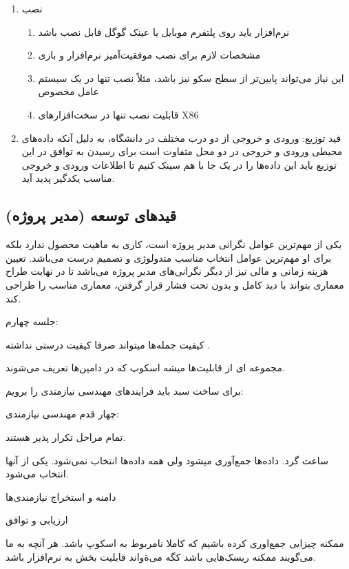 \begin{enumerate}
    \item نصب
    \begin{enumerate}
        \item نرم‌افزار باید روی پلتفرم موبایل یا عینک گوگل قابل نصب باشد
        \item مشخصات لازم برای نصب موفقیت‌آمیز نرم‌افزار و بازی
        \item این نیاز می‌تواند پایین‌تر از سطح سکو نیز باشد، مثلاً نصب تنها در
        یک سیستم عامل مخصوص
        \item قابلیت نصب تنها در سخت‌افزار‌های X86
    \end{enumerate}
    \item قید توزیع: ورودی و خروجی از دو درب مختلف در دانشگاه، به دلیل آنکه
    داده‌های محیطی ورودی و خروجی در دو محل متفاوت است برای رسیدن به توافق در این
    توزیع باید این داده‌ها را در یک جا با هم سینک کنیم تا اطلاعات ورودی و خروجی
    مناسب یکدگیر پدید آید.
\end{enumerate}

\subsection{قید‌های توسعه  (مدیر پروژه)}

یکی از مهم‌ترین عوامل نگرانی مدیر پروژه است، کاری به ماهیت محصول ندارد بلکه برای
او مهم‌ترین عوامل انتخاب مناسب متدولوژی و تصمیم درست می‌باشد. تعیین هزینه زمانی
و مالی نیز از دیگر نگرانی‌های مدیر پروژه می‌باشد تا در نهایت طراح معماری بتواند
با دید کامل و بدون تحت فشار قرار گرفتن، معماری مناسب را طراحی کند.

جلسه چهارم:


کیفیت جمله‌ها میتواند صرفا کیفیت درستی نداشته .

مجموعه ای از قابلیت‌ها میشه اسکوپ که در دامین‌ها تعریف می‌شوند.

برای ساخت سبد باید فرایند‌های مهندسی نیازمندی را برویم:

چهار قدم مهندسی نیازمندی:

تمام مراحل تکرار پذیر هستند.

ساعت گرد. داده‌ها جمع‌آوری میشود ولی همه داده‌ها انتخاب نمی‌شود. یکی از آنها
انتخاب می‌شود.

دامنه و استخراج نیازمندی‌ها

ارزیابی و توافق

ممکنه چیزایی جمع‌اوری کرده باشیم که کاملا نامربوط به اسکوپ باشد. هر آنچه به ما
می‌گویند ممکنه ریسک‌هایی باشد کگه می‌ةواند قابلیت بخش به نرم‌افزار باشد.

